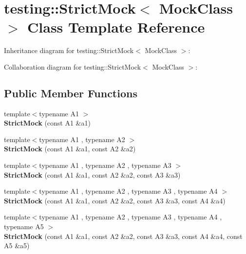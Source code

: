 \hypertarget{classtesting_1_1StrictMock}{}\section{testing\+:\+:Strict\+Mock$<$ Mock\+Class $>$ Class Template Reference}
\label{classtesting_1_1StrictMock}


Inheritance diagram for testing\+:\+:Strict\+Mock$<$ Mock\+Class $>$\+:


Collaboration diagram for testing\+:\+:Strict\+Mock$<$ Mock\+Class $>$\+:
\subsection*{Public Member Functions}
\begin{DoxyCompactItemize}
\item 
\mbox{\label{classtesting_1_1StrictMock_a42db27ba0af29804db8589676817aff8}} 
{\footnotesize template$<$typename A1 $>$ }\\{\bfseries Strict\+Mock} (const A1 \&a1)
\item 
\mbox{\label{classtesting_1_1StrictMock_a345933f3f1a10de381a508f93e680c6b}} 
{\footnotesize template$<$typename A1 , typename A2 $>$ }\\{\bfseries Strict\+Mock} (const A1 \&a1, const A2 \&a2)
\item 
\mbox{\label{classtesting_1_1StrictMock_acc25729cd85a3a412106863894a30fe7}} 
{\footnotesize template$<$typename A1 , typename A2 , typename A3 $>$ }\\{\bfseries Strict\+Mock} (const A1 \&a1, const A2 \&a2, const A3 \&a3)
\item 
\mbox{\label{classtesting_1_1StrictMock_a6b42ef1460901ea91a2a09f44ae8fba2}} 
{\footnotesize template$<$typename A1 , typename A2 , typename A3 , typename A4 $>$ }\\{\bfseries Strict\+Mock} (const A1 \&a1, const A2 \&a2, const A3 \&a3, const A4 \&a4)
\item 
\mbox{\label{classtesting_1_1StrictMock_a2019f4e86224b2adbb9e9326bc175c50}} 
{\footnotesize template$<$typename A1 , typename A2 , typename A3 , typename A4 , typename A5 $>$ }\\{\bfseries Strict\+Mock} (const A1 \&a1, const A2 \&a2, const A3 \&a3, const A4 \&a4, const A5 \&a5)

\end{DoxyCompactItemize}
